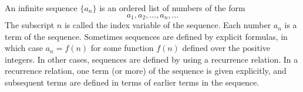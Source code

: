 \documentclass{report}
\begin{document}
    \pagebreak \bigbreak \noindent 
    \begin{definition}
        An infinite sequence $\{a_n\}$ is an ordered list of numbers of the form
        \[ a_1, a_2, \ldots, a_n, \ldots \]
        The subscript $n$ is called the index variable of the sequence. Each number $a_n$ is a term of the sequence. Sometimes sequences are defined by explicit formulas, in which case $a_n = f(n)$ for some function $f(n)$ defined over the positive integers. In other cases, sequences are defined by using a recurrence relation. In a recurrence relation, one term (or more) of the sequence is given explicitly, and subsequent terms are defined in terms of earlier terms in the sequence.


    \end{definition}
\end{document}
